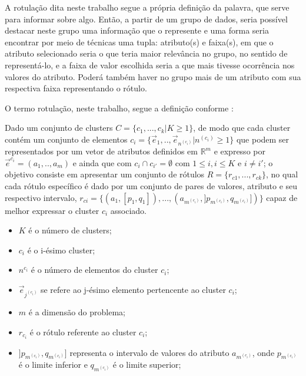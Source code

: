 A rotulação dita neste trabalho segue a própria definição da palavra, que serve para informar sobre algo. Então, a partir de um grupo de dados, seria possível destacar neste grupo uma informação que o represente e uma forma seria encontrar por meio de técnicas uma tupla: atributo(s) e faixa(s), em que o atributo selecionado seria o que teria maior relevância no grupo, no sentido de representá-lo, e a faixa de valor escolhida seria a que mais tivesse ocorrência nos valores do atributo. Poderá também haver no grupo mais de um atributo com sua respectiva faixa representando o rótulo. 


O termo rotulação, neste trabalho, segue a definição conforme \cite{Lopes2016}: 

    \begin{teorema}
Dado um conjunto de clusters ${C=\{c_1,...,c_k | K \geqslant 1\} }$, de modo que cada cluster contém um conjunto de elementos ${c_i=\{\vec{e}_1,..,\vec{e}_{n^{(c_i)}}|n^{(c_i)} \geqslant 1 \}}$ que podem ser representados por um vetor de atributos definidos em ${\mathbb{R}^m }$ e expresso por ${ \vec{e}^{c_i}=(a_1,..,a_m)  }$ e ainda que  com ${ c_i \cap c_{i'}=\emptyset }$ com ${ 1 \leqslant i, i \leqslant K  }$ e ${ i \neq i' }$; o objetivo consiste em apresentar um conjunto de rótulos ${ R=\{ r_{c1},...,r_{ck} \} }$, no qual cada rótulo específico é dado por um conjunto de pares de valores, atributo e seu respectivo intervalo, ${ r_{ci}=\{ (a_1,[p_1,q_1]),...,(a_{m^{(c_i)}}, ]p_{m^{(c_i)}},q_{m^{(c_i)}}]) \} }$ capaz de melhor expressar o cluster ${c_i}$ associado.
        \begin{itemize}[noitemsep]
            \item ${K}$ é o número de clusters;
            \item ${c_i}$ é o i-ésimo cluster;
            \item ${n^{c_i}}$ é o número de elementos do cluster ${c_i}$;
            \item ${\vec{e}_{j^{(c_i)}}}$ se refere ao j-ésimo elemento pertencente ao cluster ${c_i}$;
            \item ${m}$ é a dimensão do problema;
            \item ${r_{c_i}}$ é o rótulo referente ao cluster ${c_i}$;
            \item ${]p_{m^{(c_i)}},q_{m^{(c_i)}}]}$ representa o intervalo de valores do atributo ${a_{m^{(c_i)}} }$, onde ${ p_{m^{(c_i)}} }$  é o limite inferior e ${ q_{m^{(c_i)}} }$ é o limite superior;
        \end{itemize}
    \label{teo:lopes:problema}
    \end{teorema}


